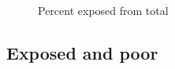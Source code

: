 \documentclass[
  letterpaper,
  DIV=11,
  numbers=noendperiod]{scrartcl}
\begin{document}
\begin{figure}[H]


\caption{\label{fig-exposed-total}Percent exposed from total}

\end{figure}%

\subsection{Exposed and poor}\label{exposed-and-poor}
\end{document}

